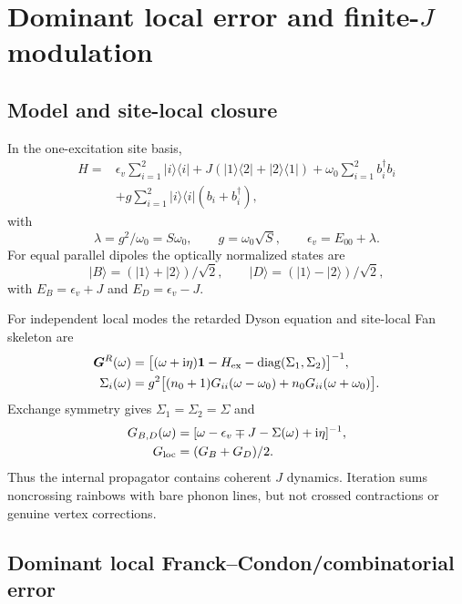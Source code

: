 \documentclass[11pt]{article}
\newcommand{\ii}{\mathrm{i}}
\newcommand{\ket}[1]{\lvert #1\rangle}
\newcommand{\bra}[1]{\langle #1\rvert}
\begin{document}
\section{Dominant local error and \texorpdfstring{finite-$J$}{finite-J} modulation}

\subsection{Model and site-local closure}

In the one-excitation site basis,
\begin{align}
H={}&\epsilon_v\sum_{i=1}^2\ket{i}\bra{i}
 +J(\ket{1}\bra{2}+\ket{2}\bra{1})
 +\omega_0\sum_{i=1}^2b_i^\dagger b_i \nonumber\\
&+g\sum_{i=1}^2\ket{i}\bra{i}(b_i+b_i^\dagger),
\label{eq:siteH}
\end{align}
with
\begin{equation}
 \lambda=g^2/\omega_0=S\omega_0,\qquad
 g=\omega_0\sqrt S,\qquad \epsilon_v=E_{00}+\lambda.
\end{equation}
For equal parallel dipoles the optically normalized states are
\begin{equation}
 \ket B=(\ket1+\ket2)/\sqrt2,\qquad
 \ket D=(\ket1-\ket2)/\sqrt2,
\end{equation}
with $E_B=\epsilon_v+J$ and $E_D=\epsilon_v-J$.

For independent local modes the retarded Dyson equation and site-local Fan
skeleton are
\begin{align}
 \bm G^R(\omega)&=\big[(\omega+\ii\eta)\bm1-H_{\rm ex}
 -\operatorname{diag}(\Sigma_1,\Sigma_2)\big]^{-1},\\
 \Sigma_i(\omega)&=g^2\big[(n_0+1)G_{ii}(\omega-\omega_0)
 +n_0G_{ii}(\omega+\omega_0)\big].
\label{eq:fan}
\end{align}
Exchange symmetry gives $\Sigma_1=\Sigma_2=\Sigma$ and
\begin{align}
G_{B,D}(\omega)&=
 [\omega-\epsilon_v\mp J-\Sigma(\omega)+\ii\eta]^{-1},\\
G_{\rm loc}&=(G_B+G_D)/2.
\end{align}
Thus the internal propagator contains coherent $J$ dynamics.  Iteration sums
noncrossing rainbows with bare phonon lines, but not crossed contractions or
genuine vertex corrections.

\subsection{Dominant local Franck--Condon/combinatorial error}
\end{document}

